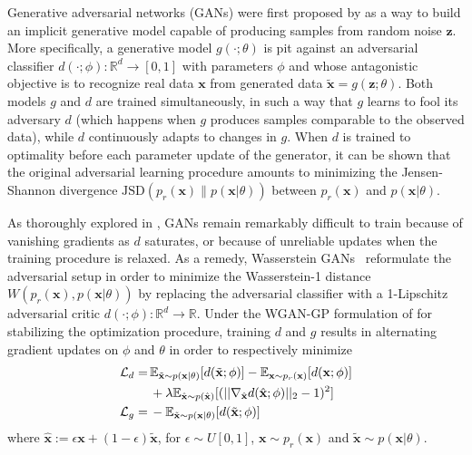 \documentclass[twocolumn,superscriptaddress,aps]{revtex4-1}
\theoremstyle{plain}
\begin{document}
Generative adversarial networks (GANs) were first proposed by
\cite{goodfellow2014generative} as a way to build an implicit generative model
capable of producing samples from random noise $\mathbf{z}$. More specifically,
a generative model $g(\cdot; \theta)$ is pit against an adversarial
classifier $d(\cdot; \phi):\mathbb{R}^d \to [0,1]$ with parameters $\phi$ and whose antagonistic objective is to recognize real data $\mathbf{x}$
from generated data $\tilde{\mathbf{x}} = g(\mathbf{z}; \theta)$. Both models $g$ and $d$
are trained simultaneously, in such a way that $g$ learns to fool
its adversary $d$ (which happens when $g$ produces samples comparable to the
observed data), while $d$ continuously adapts to changes in $g$. When $d$ is
trained to optimality before each parameter update of the generator, it can
be shown that the original adversarial learning procedure amounts to minimizing
the Jensen-Shannon divergence $\text{JSD}(p_r(\mathbf{x}) \parallel p(\mathbf{x}|\theta))$ between $p_r(\mathbf{x})$ and $p(\mathbf{x}|\theta)$.

As thoroughly explored in \citep{2017arXiv170104862A}, GANs remain remarkably
difficult to train because of vanishing gradients as $d$ saturates, or because of
unreliable updates when the training procedure is relaxed. As a remedy,
Wasserstein GANs~\citep{2017arXiv170107875A} reformulate the adversarial
setup in order to minimize the Wasserstein-1 distance $W(p_r(\mathbf{x}), p(\mathbf{x}|\theta))$ by
replacing the adversarial classifier with a 1-Lipschitz adversarial critic
$d(\cdot; \phi) : \mathbb{R}^d \to \mathbb{R}$. Under the WGAN-GP formulation of \cite{2017arXiv170400028G}
for stabilizing the optimization procedure,
training $d$ and $g$ results in alternating gradient updates on $\phi$ and $\theta$ in order to respectively minimize
\begin{align}
    {\cal L}_d =\,& \mathbb{E}_{\tilde{\mathbf{x}} \sim p(\mathbf{x}|\theta)} [d(\tilde{\mathbf{x}};\phi)] - \mathbb{E}_{\mathbf{x} \sim p_r(\mathbf{x})} [d(\mathbf{x};\phi)]  \nonumber \\
                  & + \lambda \mathbb{E}_{\hat{\mathbf{x}} \sim p({\hat{\mathbf{x}})}} [(|| \nabla_{\hat{\mathbf{x}}} d({\hat{\mathbf{x}}};\phi) ||_2 - 1)^2] \\
    {\cal L}_g =\,& -\mathbb{E}_{\tilde{\mathbf{x}} \sim p(\mathbf{x}|\theta)} [d(\tilde{\mathbf{x}};\phi)]
\end{align}
where ${\hat{\mathbf{x}}} := \epsilon \mathbf{x} +
(1-\epsilon)\tilde{\mathbf{x}}$, for $\epsilon \sim U[0,1]$, $\mathbf{x} \sim
p_r(\mathbf{x})$ and $\tilde{\mathbf{x}} \sim p(\mathbf{x}|\theta)$.
\end{document}
